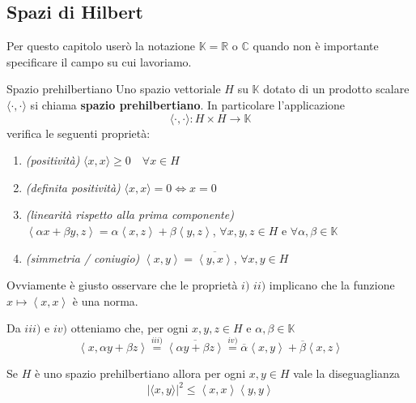 \subsection{Spazi di Hilbert}
Per questo capitolo userò la notazione \(\mathbb{K} = \mathbb{R}\) o
\(\mathbb{C}\) quando non è importante specificare il campo su cui lavoriamo.
\begin{definition}{Spazio prehilbertiano}
    Uno spazio vettoriale \(H\) su \(\mathbb{K}\) dotato di un
    prodotto scalare \(\langle \cdot, \cdot \rangle\) si chiama \textbf{spazio
    prehilbertiano}. In particolare l'applicazione
    \[
        \langle \cdot, \cdot \rangle : H \times H \to \mathbb{K}
    \]
    verifica le seguenti proprietà:
\begin{enumerate}[label = \roman*)]
    \item \emph{(positività)} \(\langle x, x \rangle \ge 0 \quad \forall x \in H\)
    \item \emph{(definita positività)} \(\langle x, x \rangle = 0 \iff x = 0\)
    \item \emph{(linearità rispetto alla prima componente)} \(\left< \alpha x + \beta y, z \right> = \alpha \left<
        x, z\right> + \beta \left<y, z \right>\), \(\forall x, y, z \in H\) e
        \(\forall \alpha, \beta \in \mathbb{K}\) 
    \item \emph{(simmetria / coniugio)} \(\left< x, y \right> = \overline{\left<
        y, x \right>}\), \(\forall x, y \in H\) 
\end{enumerate}
\end{definition}
Ovviamente è giusto osservare che le proprietà \(i)\) \(ii)\) implicano che la
funzione \(x \mapsto \left<x, x \right>\) è una norma.
\begin{remark}
    Da \(iii)\) e \(iv)\) otteniamo che, per ogni \(x, y, z \in H\) e \(\alpha,
    \beta \in \mathbb{K}\) 
    \[
        \left<x, \alpha y + \beta z \right> \overset{iii)}{=}
        \overline{\left<\alpha y + \beta z \right>} \overset{iv)}{=}
        \overline{\alpha} \left<x, y
        \right> + \overline{\beta} \left<x, z \right>
    \]
\end{remark}
\begin{theorem}
    Se \(H\) è uno spazio prehilbertiano allora per ogni \(x, y \in H\) vale la
    diseguaglianza
    \[
        |\langle x, y \rangle|^{2} \le \left<x, x \right> \left<y, y \right>
    \]
\end{theorem}
